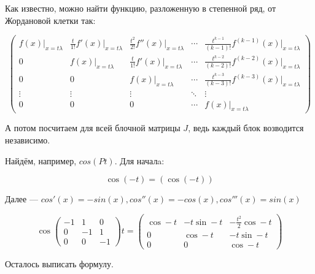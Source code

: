 \documentclass[12pt, a4paper]{article}
\begin{document}
    Как известно, можно найти функцию, разложенную в степенной ряд, от Жордановой клетки так:

    \begin{equation}
        \begin{pmatrix}
            f(x){\Bigr |}_{x=t\lambda} & \frac t{1!}f'(x){\Bigr |}_{x=t\lambda} & \frac{t^2}{2!}f''(x){\Bigr |}_{x=t\lambda} & \cdots & \frac{t^{k-1}}{(k-1)!}f^{(k-1)}(x){\Bigr |}_{x=t\lambda}\\
                0 & f(x){\Bigr |}_{x=t\lambda} & \frac t{1!}f'(x){\Bigr |}_{x=t\lambda} & \cdots & \frac{t^{k-2}}{(k-2)!}f^{(k-2)}(x){\Bigr |}_{x=t\lambda}\\
                0 & 0 & f(x){\Bigr |}_{x=t\lambda} & \cdots & \frac{t^{k-3}}{(k-3)!}f^{(k-3)}(x){\Bigr |}_{x=t\lambda}\\
                \vdots & \vdots & \vdots & \ddots & \vdots\\
                0 & 0 & 0 & \cdots & f(x){\Bigr |}_{x=t\lambda}
        \end{pmatrix}
    \end{equation}

    А потом посчитаем для всей блочной матрицы $J$, ведь каждый блок возводится независимо.

    Найдём, например, $cos(Pt)$. Для началa:

    \begin{equation}
        \cos\left( -t \right) = \left( \cos (-t) \right)
    \end{equation}

    Далее — $cos'(x) = -sin(x), cos''(x) = -cos(x), cos'''(x) = sin(x)$

    \begin{equation}
        \cos\left(\begin{matrix}
            -1 & 1 & 0 \\
            0 & -1 & 1 \\
            0 & 0 & -1
        \end{matrix}\right) t = \left(\begin{matrix}
            \cos -t & -t \sin -t & -\frac{t^2}{2} \cos -t \\
            0 & \cos -t & -t \sin -t \\
            0 & 0 & \cos -t
        \end{matrix}\right)
    \end{equation}

    Осталось выписать формулу.
\end{document}
